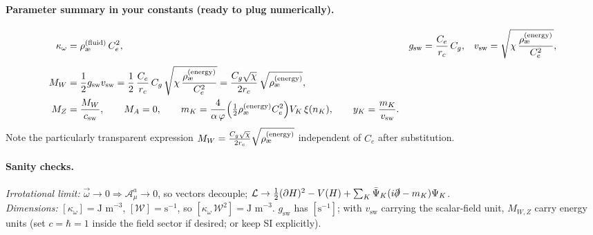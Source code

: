 \documentclass[11pt]{article}
\begin{document}
    \paragraph{Parameter summary in your constants (ready to plug numerically).}
    \begin{align}
        \kappa_\omega &= \rhof\,\Ce^2,
        &
        g_\text{sw} &= \frac{\Ce}{\rc}\,\Cg,
        &
        v_\text{sw} &= \sqrt{\chi\,\frac{\rhoe}{\Ce^2}},
        \\[4pt]
        M_W &= \frac{1}{2} g_\text{sw} v_\text{sw}
        = \frac{1}{2}\,\frac{\Ce}{\rc}\,\Cg \,\sqrt{\chi\,\frac{\rhoe}{\Ce^2}}
        = \frac{\Cg \sqrt{\chi}}{2\rc}\,\sqrt{\rhoe},
        \\
        M_Z &= \frac{M_W}{c_\text{sw}},\qquad M_A=0, \qquad
        m_K = \frac{4}{\alphaEM\,\phiG}\Big(\tfrac{1}{2}\rhoe \Ce^2\Big)V_K\,\xi(n_K),\qquad
        y_K = \frac{m_K}{v_\text{sw}}.
    \end{align}
    Note the particularly transparent expression \(M_W=\tfrac{\Cg \sqrt{\chi}}{2\rc}\sqrt{\rhoe}\) independent of \(C_e\) after substitution.

    \paragraph{Sanity checks.}
    \emph{Irrotational limit:} \(\vec\omega\to 0\Rightarrow \mathcal{A}_\mu^a\to 0\), so vectors decouple;
    \(\mathcal{L}\to \tfrac{1}{2}(\partial H)^2 - V(H) + \sum_K \bar{\Psi}_K(i\slashed{\partial}-m_K)\Psi_K\).\\
    \emph{Dimensions:} \([\kappa_\omega]=\text{J m}^{-3}\), \([\mathcal{W}] = \text{s}^{-1}\), so \([\kappa_\omega\,\mathcal{W}^2]=\text{J m}^{-3}\).
    \(g_\text{sw}\) has \([\text{s}^{-1}]\); with $v_\text{sw}$ carrying the scalar-field unit, $M_{W,Z}$ carry energy units (set $c=\hbar=1$ inside the field sector if desired; or keep SI explicitly).
\end{document}
